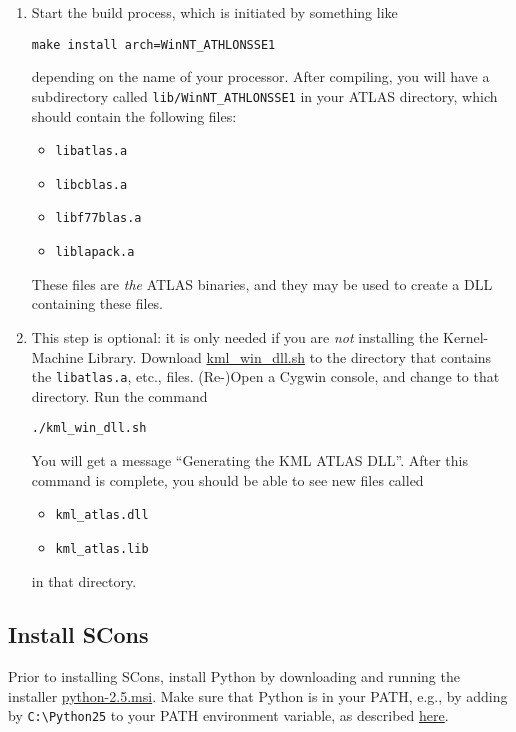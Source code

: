\documentclass{article}
\begin{document}
\begin{enumerate}
\item Start the build process, which is initiated by something like 
%
\begin{verbatim}
make install arch=WinNT_ATHLONSSE1
\end{verbatim}
%
depending on the name of your processor. After compiling, 
you will have a subdirectory called \texttt{lib/WinNT\_ATHLONSSE1} 
in your ATLAS directory, which should contain the following files:
\begin{itemize}
\item \texttt{libatlas.a}
\item \texttt{libcblas.a}
\item \texttt{libf77blas.a}
\item \texttt{liblapack.a}
\end{itemize}
These files are \emph{the} ATLAS binaries, 
and they may be used to create a DLL containing these files.

\item This step is optional: it is only needed if you are 
\emph{not} installing the Kernel-Machine Library.
Download 
\href{research/kml/kml\_win\_dll.sh}{kml\_win\_dll.sh}
to the directory that contains the \texttt{libatlas.a}, etc., files.  
(Re-)Open a Cygwin console, and change to that directory. Run the command
%
\begin{verbatim}
./kml_win_dll.sh
\end{verbatim}
%
You will get a message ``Generating
the KML ATLAS DLL''. After this command is complete, you should be able to see new 
files called
\begin{itemize}
\item \texttt{kml\_atlas.dll}
\item \texttt{kml\_atlas.lib}
\end{itemize}
in that directory.

\end{enumerate}

\subsection{Install SCons}
\label{section:install_scons}

Prior to installing SCons, install Python
by downloading and running the installer \href{http://www.python.org/ftp/python/2.5/python-2.5.msi}{python-2.5.msi}.
Make sure that Python is in your PATH, e.g., by adding by \texttt{C:\textbackslash Python25} 
to your PATH environment variable, as
described \href{http://www.python.org/doc/faq/windows.html#how-do-i-run-a-python-program-under-windows}{here}.
\end{document}
